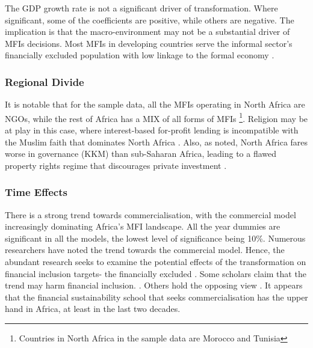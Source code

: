 \documentclass[a4paper, nobind]{templates/ociamthesis}
\begin{document}
The GDP growth rate is not a significant driver of transformation. Where significant, some of the coefficients are positive, while others are negative. The implication is that the macro-environment may not be a substantial driver of MFIs decisions. Most MFIs in developing countries serve the informal sector's financially excluded population with low linkage to the formal economy \autocite{ghosh2013microfinance}.

\hypertarget{regional-divide}{%
\subsubsection{Regional Divide}\label{regional-divide}}

It is notable that for the sample data, all the MFIs operating in North Africa are NGOs, while the rest of Africa has a MIX of all forms of MFIs \footnote{Countries in North Africa in the sample data are Morocco and Tunisia}. Religion may be at play in this case, where interest-based for-profit lending is incompatible with the Muslim faith that dominates North Africa \autocite{hassan2018religious}. Also, as noted, North Africa fares worse in governance (KKM) than sub-Saharan Africa, leading to a flawed property rights regime that discourages private investment \autocite{johnson2002property,claessens2003financial}.

\hypertarget{time-effects}{%
\subsubsection{Time Effects}\label{time-effects}}

There is a strong trend towards commercialisation, with the commercial model increasingly dominating Africa's MFI landscape. All the year dummies are significant in all the models, the lowest level of significance being 10\%. Numerous researchers have noted the trend towards the commercial model. Hence, the abundant research seeks to examine the potential effects of the transformation on financial inclusion targets- the financially excluded \autocite{d2017ngos}. Some scholars claim that the trend may harm financial inclusion. \autocite{meagher2006microfinance,hartarska2007regulated}. Others hold the opposing view \autocite{duvendack2015mis}. It appears that the financial sustainability school that seeks commercialisation has the upper hand in Africa, at least in the last two decades.

\newpage
\end{document}
